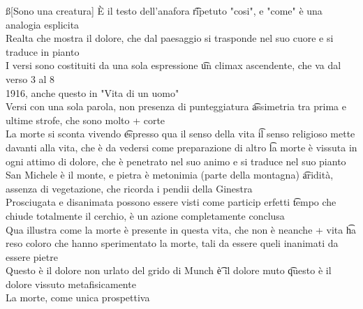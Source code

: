 \documentclass[12pt]{article}
\begin{document}
\ss[Sono una creatura]
È il testo dell'anafora \t ripetuto "cosi", e "come" è una analogia esplicita \\
Realta che mostra il dolore, che dal paesaggio si trasponde nel suo cuore e si traduce in pianto \\
I versi sono costituiti da una sola espressione \t un climax ascendente, che va dal verso 3 al 8 \\
1916, anche questo in "Vita di un uomo" \\
Versi con una sola parola, non presenza di punteggiatura \t assimetria tra prima e ultime strofe, che sono molto + corte \\
La morte si sconta vivendo \t espresso qua il senso della vita \t il senso religioso mette davanti alla vita, che è da vedersi come preparazione di altro \t la morte è vissuta in ogni attimo di dolore, che è penetrato nel suo animo e si traduce nel suo pianto \\
San Michele è il monte, e pietra è metonimia (parte della montagna) \t aridità, assenza di vegetazione, che ricorda i pendii della Ginestra \\
Prosciugata e disanimata possono essere visti come particip erfetti \t tempo che chiude totalmente il cerchio, è un azione completamente conclusa \\
Qua illustra come la morte è presente in questa vita, che non è neanche + vita \t ha reso coloro che hanno sperimentato la morte, tali da essere queli inanimati da essere pietre \\
Questo è il dolore non urlato del grido di Munch \t è il dolore muto \t questo è il dolore vissuto metafisicamente \\
La morte, come unica prospettiva 
\end{document}
